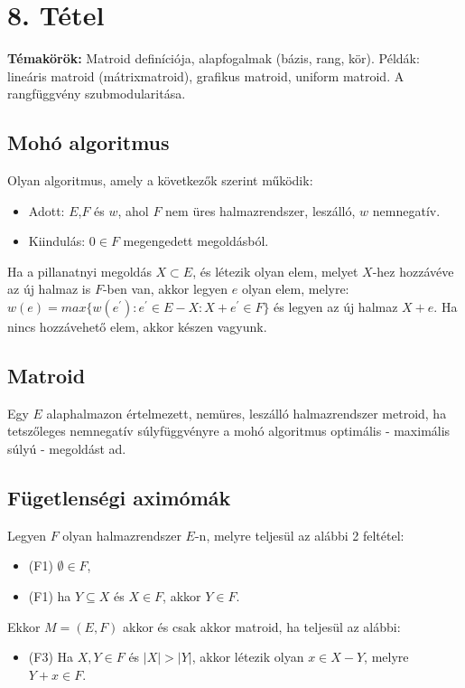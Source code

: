 
\setcounter{chapter}{8}
\chapter*{8. Tétel}

\textbf{Témakörök:} Matroid definíciója, alapfogalmak (bázis, rang, kör). Példák: lineáris matroid (mátrixmatroid), grafikus matroid, uniform matroid. A rangfüggvény szubmodularitása.

\noindent\hrulefill

\section*{Mohó algoritmus}

Olyan algoritmus, amely a következők szerint működik:
\begin{itemize}
\item Adott: $E$,$F$ és $w$, ahol $F$ nem üres halmazrendszer, leszálló, $w$ nemnegatív.
\item Kiindulás: $0\in F$ megengedett megoldásból.
\end{itemize}

Ha a pillanatnyi megoldás $X\subset E$, és létezik olyan elem, melyet $X$-hez hozzávéve az új halmaz is $F$-ben van, akkor legyen $e$ olyan elem, melyre: \\
$w(e)=max\lbrace w(e^{'}):e^{'}\in E-X:X+e^{'}\in F\rbrace$ és legyen az új halmaz $X+e$. Ha nincs hozzávehető elem, akkor készen vagyunk.

\section*{Matroid}
\begin{defn}
Egy $E$ alaphalmazon értelmezett, nemüres, leszálló halmazrendszer metroid, ha tetszőleges nemnegatív súlyfüggvényre a mohó algoritmus optimális - maximális súlyú - megoldást ad.
\end{defn}

\section*{Fügetlenségi aximómák}
Legyen $F$ olyan halmazrendszer $E$-n, melyre teljesül az alábbi 2 feltétel:
\begin{itemize}
	\item (F1) $\emptyset \in F$,
	\item (F1) ha $Y\subseteq X$ és $X\in F$, akkor $Y\in F$.
\end{itemize}
Ekkor $M=(E,F)$ akkor és csak akkor matroid, ha teljesül az alábbi:
\begin{itemize}
	\item (F3) Ha $X,Y\in F$ és $|X|>|Y|$, akkor létezik olyan $x\in X-Y$, melyre $Y+x\in F$.
\end{itemize}

